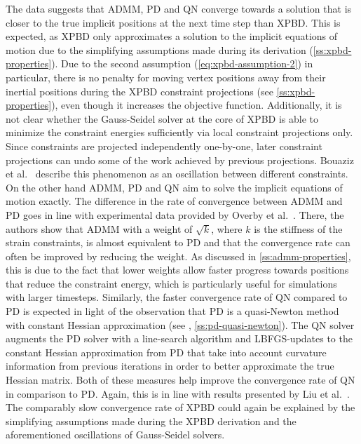 The data suggests that ADMM, PD and QN converge towards a solution that is closer to the true implicit positions at the next time step than XPBD. This is expected, 
as XPBD only approximates a solution to the implicit equations of motion due to the simplifying assumptions made during its derivation (\cref{ss:xpbd-properties}).
Due to the second assumption (\cref{eq:xpbd-assumption-2}) in particular, there is no penalty for moving vertex positions away from their inertial positions during 
the XPBD constraint projections (see \cref{ss:xpbd-properties}), even though it increases the objective function. Additionally,
it is not clear whether the Gauss-Seidel solver at the core of XPBD is able to minimize the constraint energies sufficiently via local constraint projections only.
Since constraints are projected independently one-by-one, later constraint projections can undo some of the work achieved by previous projections. Bouaziz et al.\ 
\cite{bouaziz2014} describe this phenomenon as an oscillation between different constraints. On the other hand ADMM, PD and QN aim to solve the implicit equations 
of motion exactly. The difference in the rate of convergence between ADMM and PD goes in line 
with experimental data provided by Overby et al.\ \cite{overby2017}. There, the authors show that ADMM with a weight of $\sqrt{k}$, where $k$ is the stiffness of the 
strain constraints, is almost equivalent to PD and that the convergence rate can often be improved by reducing the weight. As discussed in 
\autoref{ss:admm-properties}, this is due to the fact that lower weights allow faster progress towards positions that reduce the constraint energy, which is particularly 
useful for simulations with larger timesteps. Similarly, the faster convergence rate of QN compared to PD is expected in light of the observation that PD is a quasi-Newton method 
with constant Hessian approximation (see \cite{liu2017}, \cref{ss:pd-quasi-newton}). The QN solver augments the PD solver with a line-search algorithm and LBFGS-updates to 
the constant Hessian approximation from PD that take into account curvature information from previous iterations in order to better approximate the true Hessian matrix. Both
of these measures help improve the convergence rate of QN in comparison to PD. Again, this is in line with results presented by Liu et al.\ \cite{liu2017}. The comparably
slow convergence rate of XPBD could again be explained by the simplifying assumptions made during the XPBD derivation and the aforementioned oscillations of Gauss-Seidel
solvers. 

